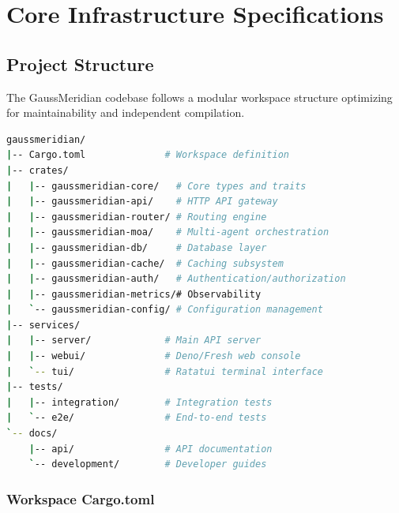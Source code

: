 \documentclass[12pt,a4paper,twoside]{report}
\begin{document}
\tableofcontents
\listoffigures
\listoftables
\lstlistoflistings


\chapter{Core Infrastructure Specifications}

\section{Project Structure}

The GaussMeridian codebase follows a modular workspace structure optimizing for maintainability and independent compilation.

\begin{lstlisting}[language=bash,caption={Project Directory Structure}]
gaussmeridian/
|-- Cargo.toml              # Workspace definition
|-- crates/
|   |-- gaussmeridian-core/   # Core types and traits
|   |-- gaussmeridian-api/    # HTTP API gateway
|   |-- gaussmeridian-router/ # Routing engine
|   |-- gaussmeridian-moa/    # Multi-agent orchestration
|   |-- gaussmeridian-db/     # Database layer
|   |-- gaussmeridian-cache/  # Caching subsystem
|   |-- gaussmeridian-auth/   # Authentication/authorization
|   |-- gaussmeridian-metrics/# Observability
|   `-- gaussmeridian-config/ # Configuration management
|-- services/
|   |-- server/             # Main API server
|   |-- webui/              # Deno/Fresh web console
|   `-- tui/                # Ratatui terminal interface
|-- tests/
|   |-- integration/        # Integration tests
|   `-- e2e/                # End-to-end tests
`-- docs/
    |-- api/                # API documentation
    `-- development/        # Developer guides
\end{lstlisting}

\subsection{Workspace Cargo.toml}
\end{document}
